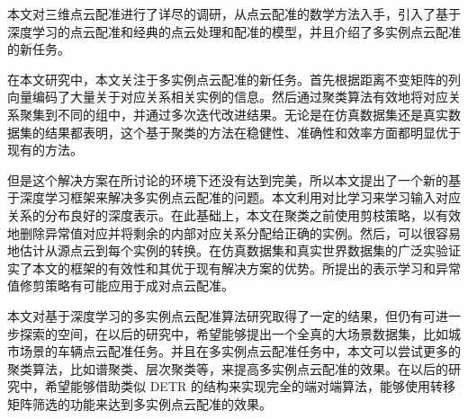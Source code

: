 %
%
%
%
%
%

\begin{conclusion}
  本文对三维点云配准进行了详尽的调研，从点云配准的数学方法入手，引入了基于深度学习的点云配准和经典的点云处理和配准的模型，并且介绍了多实例点云配准的新任务。

  在本文研究中，本文关注于多实例点云配准的新任务。首先根据距离不变矩阵的列向量编码了大量关于对应关系相关实例的信息。然后通过聚类算法有效地将对应关系聚集到不同的组中，并通过多次迭代改进结果。无论是在仿真数据集还是真实数据集的结果都表明，这个基于聚类的方法在稳健性、准确性和效率方面都明显优于现有的方法。
  
  但是这个解决方案在所讨论的环境下还没有达到完美，所以本文提出了一个新的基于深度学习框架来解决多实例点云配准的问题。本文利用对比学习来学习输入对应关系的分布良好的深度表示。在此基础上，本文在聚类之前使用剪枝策略，以有效地删除异常值对应并将剩余的内部对应关系分配给正确的实例。然后，可以很容易地估计从源点云到每个实例的转换。在仿真数据集和真实世界数据集的广泛实验证实了本文的框架的有效性和其优于现有解决方案的优势。所提出的表示学习和异常值修剪策略有可能应用于成对点云配准。

  本文对基于深度学习的多实例点云配准算法研究取得了一定的结果，但仍有可进一步探索的空间，在以后的研究中，希望能够提出一个全真的大场景数据集，比如城市场景的车辆点云配准任务。并且在多实例点云配准任务中，本文可以尝试更多的聚类算法，比如谱聚类、层次聚类等，来提高多实例点云配准的效果。在以后的研究中，希望能够借助类似 DETR \cite{carion2020end} 的结构来实现完全的端对端算法，能够使用转移矩阵筛选的功能来达到多实例点云配准的效果。
\end{conclusion}


